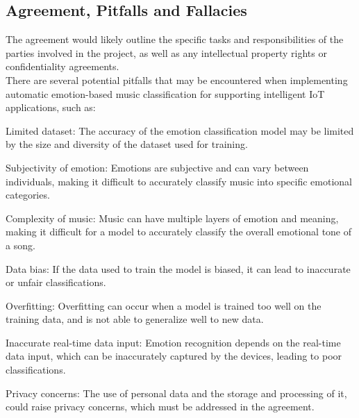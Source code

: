 \documentclass{report}
\begin{document}
\begin{multicols}{1}
    
    \section*{Agreement, Pitfalls and Fallacies}
    
    \begin{itemize}
     The agreement would likely outline the specific tasks and responsibilities of the parties involved in the project, as well as any intellectual property rights or confidentiality agreements.\\
     
     There are several potential pitfalls that may be encountered when implementing automatic emotion-based music classification for supporting intelligent IoT applications, such as:

Limited dataset: The accuracy of the emotion classification model may be limited by the size and diversity of the dataset used for training.

Subjectivity of emotion: Emotions are subjective and can vary between individuals, making it difficult to accurately classify music into specific emotional categories.

Complexity of music: Music can have multiple layers of emotion and meaning, making it difficult for a model to accurately classify the overall emotional tone of a song.

Data bias: If the data used to train the model is biased, it can lead to inaccurate or unfair classifications.

Overfitting: Overfitting can occur when a model is trained too well on the training data, and is not able to generalize well to new data.

Inaccurate real-time data input: Emotion recognition depends on the real-time data input, which can be inaccurately captured by the devices, leading to poor classifications.

Privacy concerns: The use of personal data and the storage and processing of it, could raise privacy concerns, which must be addressed in the agreement.\\ 


\end{itemize}
\end{multicols}
\end{document}
